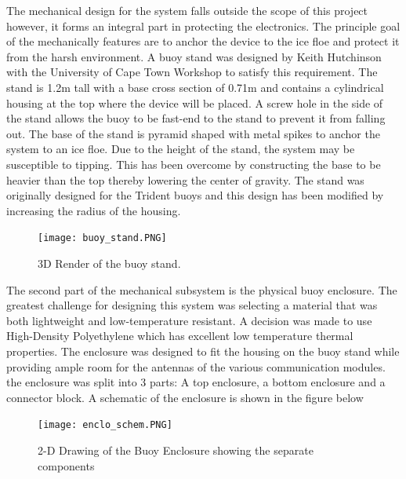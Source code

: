 The mechanical design for the system falls outside the scope of this project however, it forms an integral part in protecting the electronics. The principle goal of the mechanically features are to anchor the device to the ice floe and protect it from the harsh environment. A buoy stand was designed by Keith Hutchinson with the University of Cape Town Workshop to satisfy this requirement. The stand is 1.2m tall with a base cross section of 0.71m and contains a cylindrical housing at the top where the device will be placed. A screw hole in the side of the stand allows the buoy to be fast-end to the stand to prevent it from falling out. The base of the stand is pyramid shaped with metal spikes to anchor the system to an ice floe. Due to the height of the stand, the system may be susceptible to tipping. This has been overcome by constructing the base to be heavier than the top thereby lowering the center of gravity. The stand was originally designed for the Trident buoys and this design has been modified by increasing the radius of the housing. 

\begin{figure}[H]
    \centering
    \texttt{[image: buoy\_stand.PNG]}
    \caption{3D Render of the buoy stand.}
    \label{fig:stand}
\end{figure}

The second part of the mechanical subsystem is the physical buoy enclosure. The greatest challenge for designing this system was selecting a material that was both lightweight and low-temperature resistant. A decision was made to use High-Density Polyethylene which has excellent low temperature thermal properties. The enclosure was designed to fit the housing on the buoy stand while providing ample room for the antennas of the various communication modules. the enclosure was split into 3 parts: A top enclosure, a bottom enclosure and a connector block. A schematic of the enclosure is shown in the figure below

\begin{figure}[H]
    \centering
    \texttt{[image: enclo\_schem.PNG]}
    \caption{2-D Drawing of the Buoy Enclosure showing the separate components}
    \label{fig:enclo_schem}
\end{figure}


